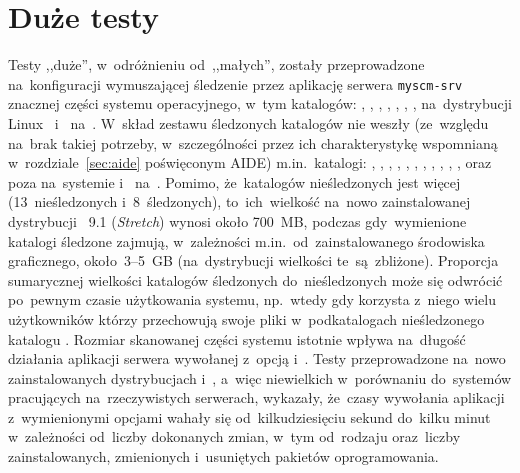 \documentclass[thesis]{subfiles}
\begin{document}

\section{Duże testy}
\label{sec:duze-testy}

Testy ,,duże'', w~odróżnieniu od~,,małych'', zostały przeprowadzone na~konfiguracji wymuszającej śledzenie przez aplikację serwera \texttt{myscm-srv} znacznej części systemu operacyjnego, w~tym katalogów: , , , , , , ,  na~dystrybucji Linux~\debian{} i~ na~\linuxarch. W~skład zestawu śledzonych katalogów nie weszły (ze~względu na~brak takiej potrzeby, w~szczególności przez ich charakterystykę wspomnianą w~rozdziale~\ref{sec:aide} poświęconym AIDE) m.in.~katalogi: , , , , , , , , , , ,  oraz~ poza  na~systemie \debian{} i~ na~\linuxarch{}. Pomimo, że~katalogów nieśledzonych jest więcej (13~nieśledzonych i~8~śledzonych), to~ich~wielkość na~nowo zainstalowanej dystrybucji \debian{}~9.1 (\emph{Stretch}) wynosi około 700~MB, podczas gdy~wymienione katalogi śledzone zajmują, w~zależności m.in.~od~zainstalowanego środowiska graficznego, około~3--5~GB (na~dystrybucji \linuxarch{} wielkości te~są~zbliżone). Proporcja sumarycznej wielkości katalogów śledzonych do~nieśledzonych może się odwrócić po~pewnym czasie użytkowania systemu, np.~wtedy gdy korzysta z~niego wielu użytkowników którzy przechowują swoje pliki w~podkatalogach nieśledzonego katalogu . Rozmiar skanowanej części systemu istotnie wpływa na~długość działania aplikacji serwera \texttt{\srvappname{}} wywołanej z~opcją  i~. Testy przeprowadzone na~nowo zainstalowanych dystrybucjach \debian{} i~\arch{}, a~więc niewielkich w~porównaniu do~systemów pracujących na~rzeczywistych serwerach, wykazały, że~czasy wywołania aplikacji z~wymienionymi opcjami wahały się od~kilkudziesięciu sekund do~kilku minut w~zależności od~liczby dokonanych zmian, w~tym od~rodzaju oraz~liczby zainstalowanych, zmienionych i~usuniętych pakietów oprogramowania.
\end{document}
